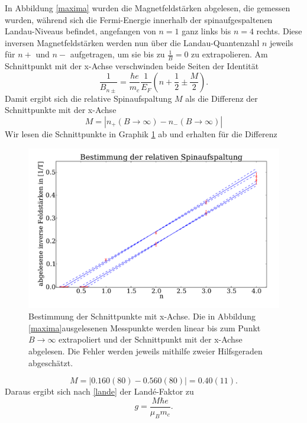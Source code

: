 \documentclass[paper=a4,fontsize=10pt,DIV=18,twocolumn,parskip=half]{scrartcl}
\numberwithin{equation}{section}    %
\begin{document}
In Abbildung \ref{maxima} wurden die Magnetfeldstärken abgelesen, die gemessen wurden, während sich die Fermi-Energie innerhalb der spinaufgespaltenen Landau-Niveaus befindet, angefangen von $n=1$ ganz links bis $n=4$ rechts. Diese inversen Magnetfeldstärken werden nun über die Landau-Quantenzahl $n$ jeweils für $n+$ und $n-$ aufgetragen, um sie bis zu $\frac{1}{B}=0$ zu extrapolieren. Am Schnittpunkt mit der x-Achse verschwinden beide Seiten der Identität
\begin{equation}
\frac{1}{B_{n\pm}}=\frac{\hbar e}{m_c}\frac{1}{E_F}\left(n+\frac{1}{2}\pm\frac{M}{2}\right).
\end{equation}
Damit ergibt sich die relative Spinaufspaltung $M$ als die Differenz der Schnittpunkte mit der x-Achse
\begin{equation}
M=|n_+(B\rightarrow \infty)- n_-(B\rightarrow \infty)|
\end{equation}
Wir lesen die Schnittpunkte in Graphik \ref{spinaufspaltung} ab und erhalten für die Differenz
\begin{figure}[]
	\begin{center}
		\includegraphics[width=\columnwidth]{Data-Plots/07-Spinaufspaltung.pdf}
		\caption{Bestimmung der Schnittpunkte mit x-Achse. Die in Abbildung \ref{maxima}ausgelesenen Messpunkte werden linear bis zum Punkt $B\rightarrow \infty$ extrapoliert und der Schnittpunkt mit der x-Achse abgelesen. Die Fehler werden jeweils mithilfe zweier Hilfsgeraden abgeschätzt.}
		\label{spinaufspaltung}
	\end{center}
\end{figure}
\begin{equation}
M=|0.160(80)-0.560(80)|=0.40(11).
\end{equation}
Daraus ergibt sich nach \eqref{lande} der Landé-Faktor zu
\begin{equation}
g=\frac{M \hbar e}{\mu_B m_c}.
\end{equation}
\end{document}
